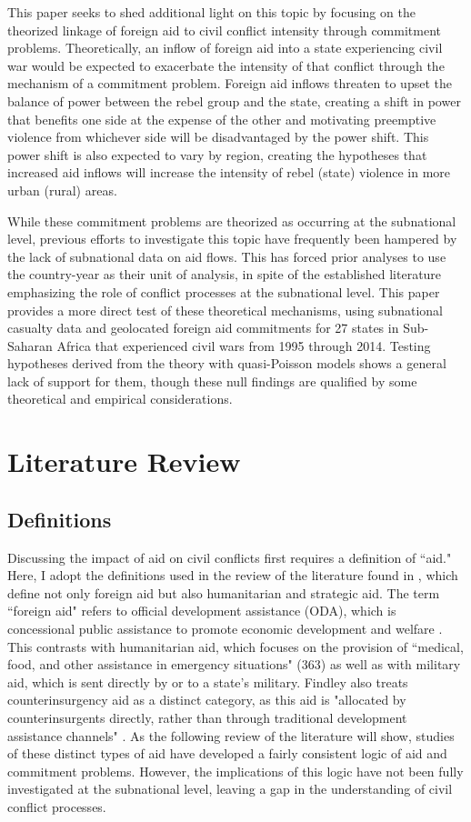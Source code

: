 \documentclass[12pt, letterpaper]{article}
\renewcommand{\cite}{\citep}
\begin{document}
This paper seeks to shed additional light on this topic by focusing on the theorized linkage of foreign aid to civil conflict intensity through commitment problems. Theoretically, an inflow of foreign aid into a state experiencing civil war would be expected to exacerbate the intensity of that conflict through the mechanism of a commitment problem. Foreign aid inflows threaten to upset the balance of power between the rebel group and the state, creating a shift in power that benefits one side at the expense of the other and motivating preemptive violence from whichever side will be disadvantaged by the power shift. This power shift is also expected to vary by region, creating the hypotheses that increased aid inflows will increase the intensity of rebel (state) violence in more urban (rural) areas.

While these commitment problems are theorized as occurring at the subnational level, previous efforts to investigate this topic have frequently been hampered by the lack of subnational data on aid flows. This has forced prior analyses to use the country-year as their unit of analysis, in spite of the established literature emphasizing the role of conflict processes at the subnational level. This paper provides a more direct test of these theoretical mechanisms, using subnational casualty data and geolocated foreign aid commitments for 27 states in Sub-Saharan Africa that experienced civil wars from 1995 through 2014. Testing hypotheses derived from the theory with quasi-Poisson models shows a general lack of support for them, though these null findings are qualified by some theoretical and empirical considerations.


\section{Literature Review}
\subsection{Definitions}

	Discussing the impact of aid on civil conflicts first requires a definition of “aid." Here, I adopt the definitions used in the review of the literature found in \citet{findley2018}, which define not only foreign aid but also humanitarian and strategic aid. The term “foreign aid" refers to official development assistance (ODA), which is concessional public assistance to promote economic development and welfare \cite[p.~362]{findley2018}. This contrasts with humanitarian aid, which focuses on the provision of “medical, food, and other assistance in emergency situations" (363) as well as with military aid, which is sent directly by or to a state's military. Findley also treats counterinsurgency aid as a distinct category, as this aid is "allocated by counterinsurgents directly, rather than through traditional development assistance channels" \cite[p.~363]{findley2018}. As the following review of the literature will show, studies of these distinct types of aid have developed a fairly consistent logic of aid and commitment problems. However, the implications of this logic have not been fully investigated at the subnational level, leaving a gap in the understanding of civil conflict processes.
\end{document}
